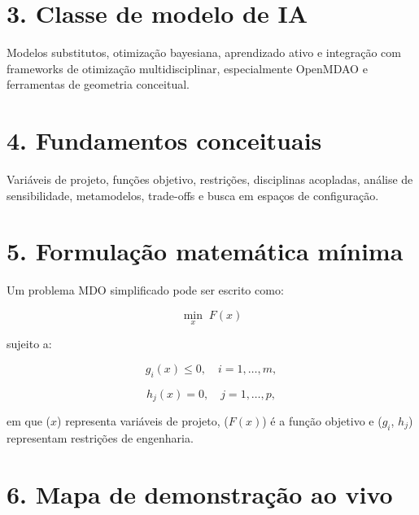\documentclass[
  brazilian,
  a4paper,
  DIV=11,
  numbers=noendperiod]{scrreprt}
\begin{document}
\section{3. Classe de modelo de IA}\label{classe-de-modelo-de-ia-3}

Modelos substitutos, otimização bayesiana, aprendizado ativo e
integração com frameworks de otimização multidisciplinar, especialmente
OpenMDAO e ferramentas de geometria conceitual.

\section{4. Fundamentos conceituais}\label{fundamentos-conceituais-3}

Variáveis de projeto, funções objetivo, restrições, disciplinas
acopladas, análise de sensibilidade, metamodelos, trade-offs e busca em
espaços de configuração.

\section{5. Formulação matemática
mínima}\label{formulauxe7uxe3o-matemuxe1tica-muxednima-3}

Um problema MDO simplificado pode ser escrito como:

\[
\min_{x} \; F(x)
\]

sujeito a:

\[
g_i(x) \leq 0,\quad i=1,\ldots,m,
\]

\[
h_j(x) = 0,\quad j=1,\ldots,p,
\]

em que (\(x\)) representa variáveis de projeto, (\(F(x)\)) é a função
objetivo e (\(g_i\), \(h_j\)) representam restrições de engenharia.

\section{6. Mapa de demonstração ao
vivo}\label{mapa-de-demonstrauxe7uxe3o-ao-vivo-3}
\end{document}
